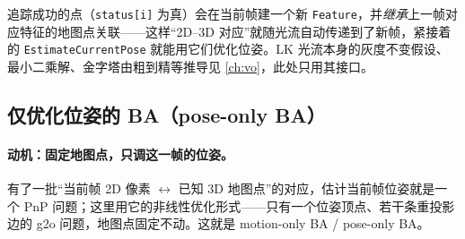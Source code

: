 \noindent 追踪成功的点（\texttt{status[i]} 为真）会在当前帧建一个新 \texttt{Feature}，并\emph{继承}上一帧对应特征的地图点关联——这样“2D--3D 对应”就随光流自动传递到了新帧，紧接着的 \texttt{EstimateCurrentPose} 就能用它们优化位姿。LK 光流本身的灰度不变假设、最小二乘解、金字塔由粗到精等推导见 \cref{ch:vo}，此处只用其接口。

\subsection{仅优化位姿的 BA（pose-only BA）}
\label{sec:sys-poseonly}

\paragraph{动机：固定地图点，只调这一帧的位姿。}
有了一批“当前帧 2D 像素 $\leftrightarrow$ 已知 3D 地图点”的对应，估计当前帧位姿就是一个 PnP 问题；这里用它的非线性优化形式——只有一个位姿顶点、若干条重投影边的 g2o 问题，地图点固定不动。这就是 motion-only BA / pose-only BA。

